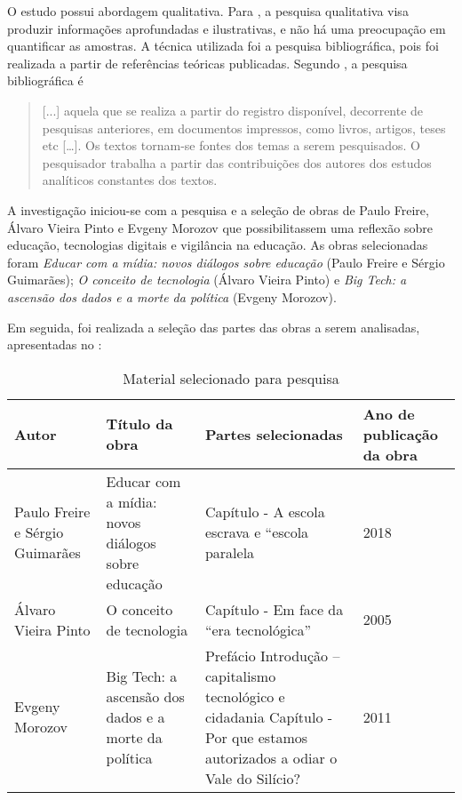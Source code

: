 \documentclass[portuguese]{textolivre}
\begin{document}
O estudo possui abordagem qualitativa. Para \textcite{gerhardt2009metodos}, a pesquisa qualitativa visa produzir informações aprofundadas e ilustrativas, e não há uma preocupação em quantificar as amostras. A técnica utilizada foi a pesquisa bibliográfica, pois foi realizada a partir de referências teóricas publicadas. Segundo \textcite[p. 76]{severino2013}, a pesquisa bibliográfica é

\begin{quote}
 [...] aquela que se realiza a partir do registro disponível, decorrente de pesquisas anteriores, em documentos impressos, como livros, artigos, teses etc […]. Os textos tornam-se fontes dos temas a serem pesquisados. O pesquisador trabalha a partir das contribuições dos autores dos estudos analíticos constantes dos textos.
\end{quote}

A investigação iniciou-se com a pesquisa e a seleção de obras de Paulo Freire, Álvaro Vieira Pinto e Evgeny Morozov que possibilitassem uma reflexão sobre educação, tecnologias digitais e vigilância na educação. As obras selecionadas foram \emph{Educar com a mídia: novos diálogos sobre educação} (Paulo Freire e Sérgio Guimarães); \emph{O conceito de tecnologia} (Álvaro Vieira Pinto) e \emph{Big Tech: a ascensão dos dados e a morte da política} (Evgeny Morozov).

Em seguida, foi realizada a seleção das partes das obras a serem analisadas, apresentadas no : 


\begin{table}[h!]
\centering
\small
\begin{threeparttable}
\caption{Material selecionado para pesquisa}
\label{tab1}
\begin{tabular}{p{2cm}p{4cm}p{5.5cm}p{1.5cm}}
\toprule
Autor & Título da obra & Partes selecionadas & Ano de publicação da obra \\
\midrule
Paulo Freire e Sérgio Guimarães & Educar com a mídia: novos diálogos sobre educação & Capítulo - A escola escrava e “escola paralela & 2018 \\
Álvaro Vieira Pinto & O conceito de tecnologia & Capítulo - Em face da “era tecnológica” & 2005 \\
Evgeny Morozov & Big Tech: a ascensão dos dados e a morte da política & Prefácio \newline Introdução – capitalismo tecnológico e cidadania \newline Capítulo - Por que estamos autorizados a odiar o Vale do Silício? & 2011
\\
\bottomrule
\end{tabular}
\end{threeparttable}
\end{table}
\end{document}
